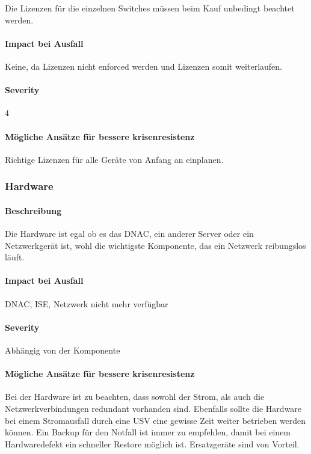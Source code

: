 Die Lizenzen für die einzelnen Switches müssen beim Kauf unbedingt beachtet werden.

\paragraph{Impact bei Ausfall}
Keine, da Lizenzen nicht enforced werden und Lizenzen somit weiterlaufen.

\paragraph{Severity} 4

\paragraph{Mögliche Ansätze für bessere krisenresistenz}
Richtige Lizenzen für alle Geräte von Anfang an einplanen.

\subsubsection{Hardware}
\paragraph{Beschreibung}
Die Hardware ist egal ob es das DNAC, ein anderer Server oder ein Netzwerkgerät ist, wohl die wichtigste Komponente, das ein Netzwerk reibungslos läuft.

\paragraph{Impact bei Ausfall}
DNAC, ISE, Netzwerk nicht mehr verfügbar

\paragraph{Severity} Abhängig von der Komponente

\paragraph{Mögliche Ansätze für bessere krisenresistenz}
Bei der Hardware ist zu beachten, dass sowohl der Strom, als auch die Netzwerkverbindungen redundant vorhanden sind. Ebenfalls sollte die Hardware bei einem Stromausfall durch eine USV eine gewisse Zeit weiter betrieben werden können. Ein Backup für den Notfall ist immer zu empfehlen, damit bei einem Hardwaredefekt ein schneller Restore möglich ist.
Ersatzgeräte sind von Vorteil.

